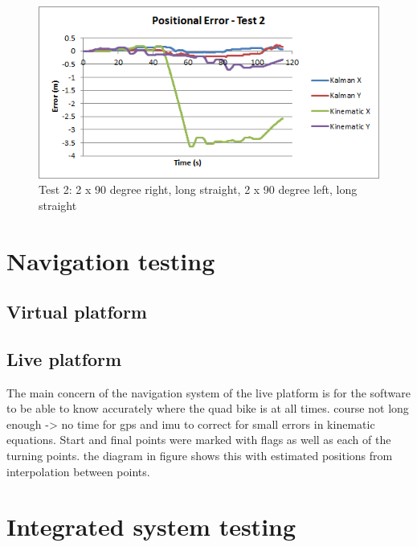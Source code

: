 \documentclass[main.tex]{subfiles}
\begin{document}
\begin{figure}[ht]
\includegraphics[width=\textwidth]{5-Testing/position_error_test_2.png}
\centering
\caption[Positioning system test 2]{Test 2: 2 x 90 degree right, long straight, 2 x 90 degree left, long straight} 
\end{figure}

\section{Navigation testing}
\subsection{Virtual platform}

\subsection{Live platform}
The main concern of the navigation system of the live platform is for the software to be able to know accurately where the quad bike is at all times. course not long enough -> no time for gps and imu to correct for small errors in kinematic equations. Start and final points were marked with flags as well as each of the turning points. the diagram in figure shows this with estimated positions from interpolation between points.

\section{Integrated system testing}
\end{document}
